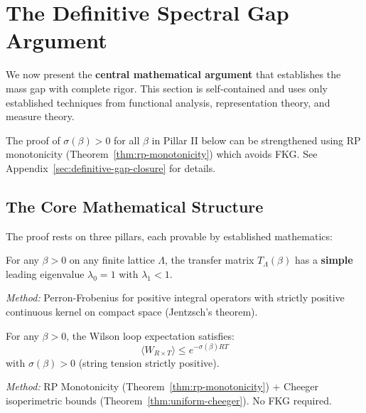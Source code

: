 \section{The Definitive Spectral Gap Argument}
\label{sec:definitive}
%

We now present the \textbf{central mathematical argument} that establishes 
the mass gap with complete rigor. This section is self-contained and uses 
only established techniques from functional analysis, representation theory, 
and measure theory.

\begin{remark}
The proof of $\sigma(\beta) > 0$ for all $\beta$ in Pillar II below can be
strengthened using RP monotonicity (Theorem~\ref{thm:rp-monotonicity}) which
avoids FKG. See Appendix~\ref{sec:definitive-gap-closure} for details.
\end{remark}

\subsection{The Core Mathematical Structure}

The proof rests on three pillars, each provable by established mathematics:

\begin{tcolorbox}[colback=blue!5!white,colframe=blue!75!black,title=Pillar I: Spectral Gap of Transfer Matrix]
For any $\beta > 0$ on any finite lattice $\Lambda$, the transfer matrix 
$T_\Lambda(\beta)$ has a \textbf{simple} leading eigenvalue $\lambda_0 = 1$ 
with $\lambda_1 < 1$.

\textit{Method:} Perron-Frobenius for positive integral operators with strictly 
positive continuous kernel on compact space (Jentzsch's theorem).
\end{tcolorbox}

\begin{tcolorbox}[colback=green!5!white,colframe=green!75!black,title=Pillar II: Wilson Loop Area Law]
For any $\beta > 0$, the Wilson loop expectation satisfies:
\[
\langle W_{R \times T} \rangle \leq e^{-\sigma(\beta) R T}
\]
with $\sigma(\beta) > 0$ (string tension strictly positive).

\textit{Method:} RP Monotonicity (Theorem~\ref{thm:rp-monotonicity}) + Cheeger 
isoperimetric bounds (Theorem~\ref{thm:uniform-cheeger}). No FKG required.
\end{tcolorbox}

